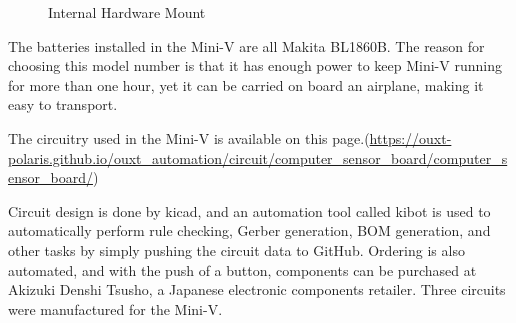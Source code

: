 \documentclass[lettersize,journal]{IEEEtran}
\begin{document}
\begin{figure}[H]
  \begin{center}
  \end{center}
  \caption{Internal Hardware Mount}
  \label{fig:internal_hardware_mount}
\end{figure}

The batteries installed in the Mini-V are all Makita BL1860B.
The reason for choosing this model number is that it has enough power to keep Mini-V running for more than one hour, yet it can be carried on board an airplane, making it easy to transport.

The circuitry used in the Mini-V is available on this page.(\url{https://ouxt-polaris.github.io/ouxt_automation/circuit/computer_sensor_board/computer_sensor_board/})

Circuit design is done by kicad, and an automation tool called kibot is used to automatically perform rule checking, Gerber generation, BOM generation, and other tasks by simply pushing the circuit data to GitHub.
Ordering is also automated, and with the push of a button, components can be purchased at Akizuki Denshi Tsusho, a Japanese electronic components retailer.
Three circuits were manufactured for the Mini-V.
\end{document}
